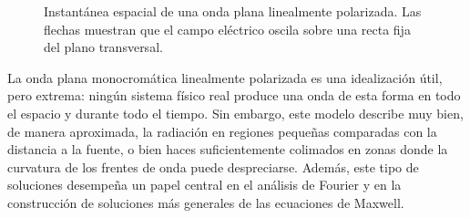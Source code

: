 \documentclass[../main.tex]{subfiles}
\begin{document}
\begin{figure}[ht]
    \centering
    \begingroup
    \shorthandoff{<>}
    \endgroup
    \caption{Instantánea espacial de una onda plana linealmente polarizada. Las flechas muestran que el campo eléctrico oscila sobre una recta fija del plano transversal.}
    \label{fig:polarizacion-lineal-instantanea}
\end{figure}



La onda plana monocromática linealmente polarizada es una idealización útil, pero extrema: ningún sistema físico real produce una onda de esta forma en todo el espacio y durante todo el tiempo. Sin embargo, este modelo describe muy bien, de manera aproximada, la radiación en regiones pequeñas comparadas con la distancia a la fuente, o bien haces suficientemente colimados en zonas donde la curvatura de los frentes de onda puede despreciarse. Además, este tipo de soluciones desempeña un papel central en el análisis de Fourier y en la construcción de soluciones más generales de las ecuaciones de Maxwell.
\end{document}
